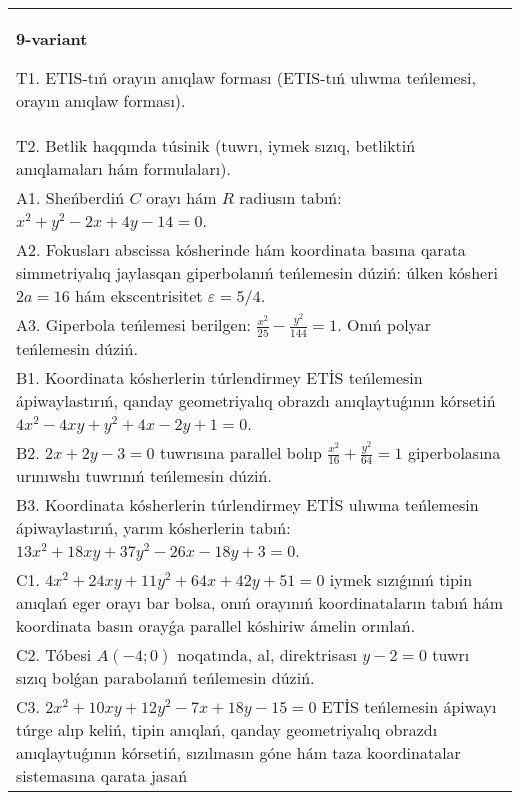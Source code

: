\documentclass{article}
\begin{document}
\begin{tabular}{m{17cm}}
\textbf{9-variant}
\newline

T1. ETIS-tıń orayın anıqlaw forması (ETIS-tıń ulıwma teńlemesi, orayın anıqlaw forması).\\

T2. Betlik haqqında túsinik (tuwrı, iymek sızıq, betliktiń anıqlamaları hám formulaları).\\

A1. Sheńberdiń $C$ orayı hám $R$ radiusın tabıń: $x^2+y^2-2 x+4 y-14=0$.\\

A2. Fokusları abscissa kósherinde hám koordinata basına qarata simmetriyalıq jaylasqan giperbolanıń teńlemesin dúziń: úlken kósheri $2 a=16$ hám ekscentrisitet $\varepsilon=5/4$.\\

A3. Giperbola teńlemesi berilgen: $\frac{x^{2}}{25}-\frac{y^{2}}{144}=1$. Onıń polyar teńlemesin dúziń.\\

B1. Koordinata kósherlerin túrlendirmey ETİS teńlemesin ápiwaylastırıń, qanday geometriyalıq obrazdı anıqlaytuǵının kórsetiń $4x^{2} - 4xy + y^{2} + 4x - 2y + 1 = 0$.  \\

B2. $2x + 2y - 3 = 0$ tuwrısına parallel bolıp $\frac{x^{2}}{16} + \frac{y^{2}}{64} = 1$ giperbolasına urınıwshı tuwrınıń teńlemesin dúziń.  \\

B3. Koordinata kósherlerin túrlendirmey ETİS ulıwma teńlemesin ápiwaylastırıń, yarım kósherlerin tabıń: $13x^{2} + 18xy + 37y^{2} - 26x - 18y + 3 = 0$.  \\

C1. $4x^{2} + 24xy + 11y^{2} + 64x + 42y + 51 = 0$ iymek sızıǵınıń tipin anıqlań eger orayı bar bolsa, onıń orayınıń koordinataların tabıń hám koordinata basın orayǵa parallel kóshiriw ámelin orınlań.  \\

C2. Tóbesi $A(-4;0)$ noqatında, al, direktrisası $y - 2 = 0$ tuwrı sızıq bolǵan parabolanıń teńlemesin dúziń.\\

C3. $2x^{2} + 10xy + 12y^{2} - 7x + 18y - 15 = 0$ ETİS teńlemesin ápiwayı túrge alıp keliń, tipin anıqlań, qanday geometriyalıq obrazdı anıqlaytuǵının kórsetiń, sızılmasın góne hám taza koordinatalar sistemasına qarata jasań  \\

\end{tabular}
\vspace{1cm}
\end{document}
